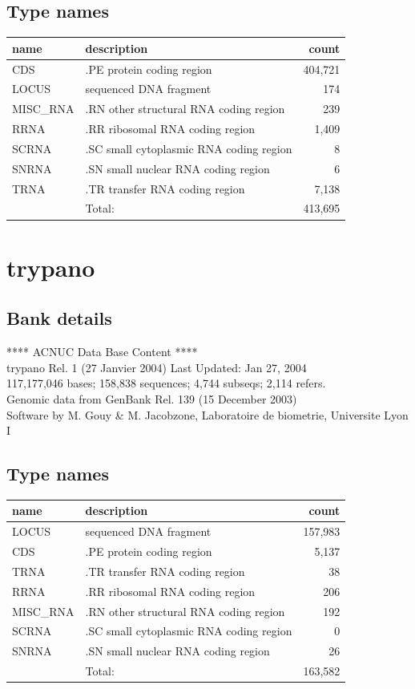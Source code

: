 \documentclass{article}
\begin{document}
\begin{Schunk}
\subsection{Type names}
\noindent\begin{tabular}{llr}
\hline \hline
name & description & count \\
\hline
CDS  &  .PE protein coding region  &  404,721 \\
LOCUS  &  sequenced DNA fragment  &  174 \\
MISC\_RNA  &  .RN other structural RNA coding region  &  239 \\
RRNA  &  .RR ribosomal RNA coding region  &  1,409 \\
SCRNA  &  .SC small cytoplasmic RNA coding region  &  8 \\
SNRNA  &  .SN small nuclear RNA coding region  &  6 \\
TRNA  &  .TR transfer RNA coding region  &  7,138 \\
\hline
 & Total: & 413,695 \\
\hline \hline
\end{tabular}

\section{ trypano }
\subsection{Bank details}
             ****     ACNUC Data Base Content      ****                         \\
         trypano Rel. 1 (27 Janvier 2004) Last Updated: Jan 27, 2004\\
117,177,046 bases; 158,838 sequences; 4,744 subseqs; 2,114 refers.\\
	Genomic data from GenBank Rel. 139 (15 December 2003)\\
Software by M. Gouy \& M. Jacobzone, Laboratoire de biometrie, Universite Lyon I 

\subsection{Type names}
\noindent\begin{tabular}{llr}
\hline \hline
name & description & count \\
\hline
LOCUS  &  sequenced DNA fragment  &  157,983 \\
CDS  &  .PE protein coding region  &  5,137 \\
TRNA  &  .TR transfer RNA coding region  &  38 \\
RRNA  &  .RR ribosomal RNA coding region  &  206 \\
MISC\_RNA  &  .RN other structural RNA coding region  &  192 \\
SCRNA  &  .SC small cytoplasmic RNA coding region  &  0 \\
SNRNA  &  .SN small nuclear RNA coding region  &  26 \\
\hline
 & Total: & 163,582 \\
\hline \hline
\end{tabular}


\end{Schunk}
\end{document}
